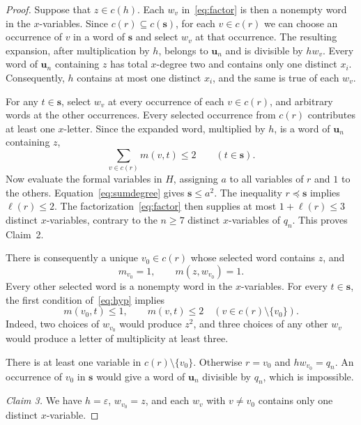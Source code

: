 \documentclass[10pt,a4paper]{amsart}
\newcommand{\eps}{\varepsilon}
\newcommand{\bu}{\mathbf u}
\newcommand{\bs}{\mathbf s}
\numberwithin{equation}{section}
\begin{document}
\begin{proof}
Suppose that $z\in c(h)$. Each $w_v$ in~\eqref{eq:factor} is then a
nonempty word in the $x$-variables. Since $c(r)\subseteq c(\bs)$, for
each $v\in c(r)$ we can choose an occurrence of $v$ in a word of $\bs$
and select $w_v$ at that occurrence. The resulting expansion, after
multiplication by $h$, belongs to $\bu_n$ and is divisible by $hw_v$.
Every word of $\bu_n$ containing $z$ has total $x$-degree two and
contains only one distinct $x_i$. Consequently, $h$ contains at most one
distinct $x_i$, and the same is true of each $w_v$.

For any $t\in\bs$, select $w_v$ at every occurrence of each
$v\in c(r)$, and arbitrary words at the other occurrences. Every selected
occurrence from $c(r)$ contributes at least one $x$-letter. Since the
expanded word, multiplied by $h$, is a word of $\bu_n$ containing $z$,
\begin{equation}\label{eq:sumdegree}
\sum_{v\in c(r)}m(v,t)\leq2\qquad(t\in\bs).
\end{equation}
Now evaluate the formal variables in $H$, assigning $a$ to all variables
of $r$ and $1$ to the others. Equation~\eqref{eq:sumdegree} gives
$\bs\leq a^2$. The inequality $r\preceq\bs$ implies $\ell(r)\leq2$.
The factorization~\eqref{eq:factor} then supplies at most
$1+\ell(r)\leq3$ distinct $x$-variables, contrary to the $n\geq7$
distinct $x$-variables of $q_n$. This proves Claim~2.

There is consequently a unique $v_0\in c(r)$ whose selected word
contains $z$, and
\begin{equation}\label{eq:v0}
m_{v_0}=1,\qquad m(z,w_{v_0})=1.
\end{equation}
Every other selected word is a nonempty word in the $x$-variables.
For every $t\in\bs$, the first condition of~\eqref{eq:hyp} implies
\begin{equation}\label{eq:sdegree}
m(v_0,t)\leq1,\qquad m(v,t)\leq2
\quad(v\in c(r)\setminus\{v_0\}).
\end{equation}
Indeed, two choices of $w_{v_0}$ would produce $z^2$, and three choices
of any other $w_v$ would produce a letter of multiplicity at least three.

There is at least one variable in $c(r)\setminus\{v_0\}$. Otherwise
$r=v_0$ and $hw_{v_0}=q_n$. An occurrence of $v_0$ in $\bs$ would give
a word of $\bu_n$ divisible by $q_n$, which is impossible.

\emph{Claim 3.} We have $h=\eps$, $w_{v_0}=z$, and each
$w_v$ with $v\ne v_0$ contains only one distinct $x$-variable.


\end{proof}
\end{document}
